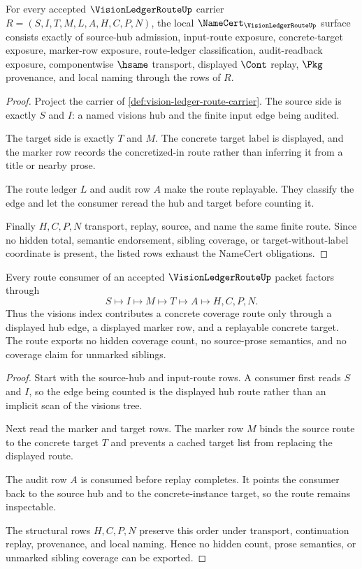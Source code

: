 \begin{theorem}
\label{thm:vision-ledger-route-namecert-obligations}
For every accepted $\VisionLedgerRouteUp$ carrier $R=(S,I,T,M,L,A,H,C,P,N)$, the local $\NameCert_{\VisionLedgerRouteUp}$ surface consists exactly of source-hub admission, input-route exposure, concrete-target exposure, marker-row exposure, route-ledger classification, audit-readback exposure, componentwise $\hsame$ transport, displayed $\Cont$ replay, $\Pkg$ provenance, and local naming through the rows of $R$.
\end{theorem}
\begin{proof}
Project the carrier of \autoref{def:vision-ledger-route-carrier}. The source side is exactly $S$ and $I$: a named visions hub and the finite input edge being audited.

The target side is exactly $T$ and $M$. The concrete target label is displayed, and the marker row records the concretized-in route rather than inferring it from a title or nearby prose.

The route ledger $L$ and audit row $A$ make the route replayable. They classify the edge and let the consumer reread the hub and target before counting it.

Finally $H,C,P,N$ transport, replay, source, and name the same finite route. Since no hidden total, semantic endorsement, sibling coverage, or target-without-label coordinate is present, the listed rows exhaust the NameCert obligations.
\end{proof}

\begin{theorem}
\label{thm:vision-ledger-route-replay-handoff}
Every route consumer of an accepted $\VisionLedgerRouteUp$ packet factors through
$$
S \longmapsto I \longmapsto M \longmapsto T \longmapsto A \longmapsto H,C,P,N .
$$
Thus the visions index contributes a concrete coverage route only through a displayed hub edge, a displayed marker row, and a replayable concrete target. The route exports no hidden coverage count, no source-prose semantics, and no coverage claim for unmarked siblings.
\end{theorem}
\begin{proof}
Start with the source-hub and input-route rows. A consumer first reads $S$ and $I$, so the edge being counted is the displayed hub route rather than an implicit scan of the visions tree.

Next read the marker and target rows. The marker row $M$ binds the source route to the concrete target $T$ and prevents a cached target list from replacing the displayed route.

The audit row $A$ is consumed before replay completes. It points the consumer back to the source hub and to the concrete-instance target, so the route remains inspectable.

The structural rows $H,C,P,N$ preserve this order under transport, continuation replay, provenance, and local naming. Hence no hidden count, prose semantics, or unmarked sibling coverage can be exported.
\end{proof}

